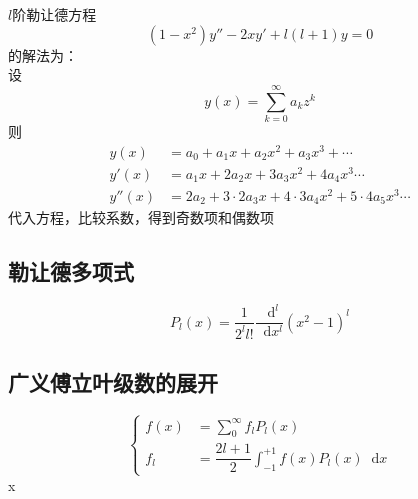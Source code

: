 \documentclass{article}
\newcommand*{\md}{\mathop{}\!\mathrm{d}}
\begin{document}
$l$阶勒让德方程
\begin{equation*}
  \label{eq:1}
  \left( 1 - x^{2} \right) y'' - 2 x y' + l \left( l + 1 \right) y = 0
\end{equation*}
的解法为：\\
设
\begin{equation*}
  \label{eq:2}
  y \left( x \right) = \sum\limits_{k = 0}^{\infty} a_{k} z^{k}
\end{equation*}
则
\begin{equation*}
  \begin{aligned}
    y \left( x\right) &= a_{0} + a_{1}x + a_{2}x^{2} + a_{3}x^{3} + \cdots \\
    y' \left( x \right) &= a_{1}x + 2 a_{2}x + 3 a_{3}x^{2} + 4 a_{4}x^{3} \cdots \\
    y'' \left( x \right) &= 2 a_{2} + 3 \cdot 2  a_{3}x + 4 \cdot 3 a_{4}x^{2} + 5 \cdot 4 a_{5} x^{3} \cdots
  \end{aligned}
\end{equation*}
代入方程，比较系数，得到奇数项和偶数项


\subsection{勒让德多项式}

\begin{equation*}
  \label{eq:6}
  P_{l} \left( x \right) = \dfrac{1}{2^{l} l!} \dfrac{\md^{l}}{\md x^{l}} \left( x^{2} - 1 \right)^{l}
\end{equation*}

\subsection{广义傅立叶级数的展开}

\begin{equation*}
  \label{eq:7}
  \left\{
    \begin{aligned}
      f(x) &= \sum\limits_{0}^{\infty} f_{l} P_{l}(x) \\
      f_{l} &= \dfrac{2l+1}{2} \int_{-1}^{+1} f(x) P_{l}(x) \md x
    \end{aligned}
  \right.
\end{equation*}x
\end{document}
